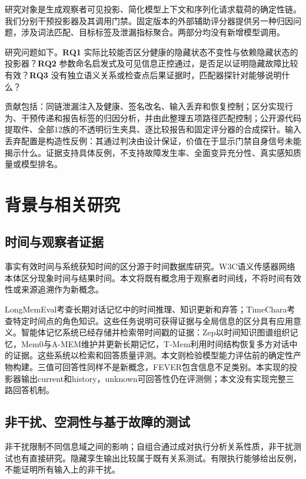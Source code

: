 \documentclass[UTF8,11pt]{ctexart}
\begin{document}
研究对象是生成观察者可见投影、简化模型上下文和序列化请求载荷的确定性链。我们分别干预投影器及其调用门禁。固定版本的外部辅助评分器提供另一种归因问题，涉及词法匹配、目标标签及泄漏指标聚合。两部分均没有新增模型调用。

研究问题如下。\textbf{RQ1} 实际比较能否区分健康的隐藏状态不变性与依赖隐藏状态的投影器？\textbf{RQ2} 参数命名启发式及可见信息正控通过，是否足以证明隐藏故障比较有效？\textbf{RQ3} 没有独立语义关系或检查点后果证据时，匹配器探针对能够说明什么？

贡献包括：同链泄漏注入及健康、签名改名、输入丢弃和恢复控制；区分实现行为、干预传递和报告标签的归因分析，并由此整理五项路径匹配控制；公开源代码提取件、全部12族的不透明衍生夹具、逐比较报告和固定评分器的合成探针。输入丢弃配置是构造性反例：其通过判决由设计保证，价值在于显示门禁自身信号未能揭示什么。证据支持具体反例，不支持故障发生率、全面变异充分性、真实感知质量或模型排名。

\section{背景与相关研究}
\subsection{时间与观察者证据}
事实有效时间与系统获知时间的区分源于时间数据库研究\cite{snodgrass}。W3C语义传感器网络本体区分现象时间与结果时间\cite{ssn}。本文将既有概念用于观察者时间线，不将时间有效性或来源追溯作为新概念。

LongMemEval考查长期对话记忆中的时间推理、知识更新和弃答\cite{longmemeval}；TimeChara考查特定时间点的角色知识\cite{timechara}。这些任务说明可获得证据与全局信息的区分具有应用意义。智能体记忆系统已经存储并检索带时间戳的证据：Zep以时间知识图谱组织记忆\cite{zep}，Mem0与A-MEM维护并更新长期记忆\cite{mem0,amem}，T-Mem利用时间结构恢复多方对话中的证据\cite{tmem}。这些系统以检索和回答质量评测。本文则检验模型能力评估前的确定性产物构建。三值可回答性同样不是新概念，FEVER包含信息不足类别\cite{fever}。本实现的投影器输出current和history，unknown可回答性仍在评测侧；本文没有实现完整三路回答机制。

\subsection{非干扰、空洞性与基于故障的测试}
非干扰限制不同信息域之间的影响\cite{goguen}；自组合通过成对执行分析关系性质\cite{barthe}，非干扰测试也有直接研究\cite{hritcu}。隐藏孪生输出比较属于既有关系测试。有限执行能够给出反例，不能证明所有输入上的非干扰。
\end{document}
